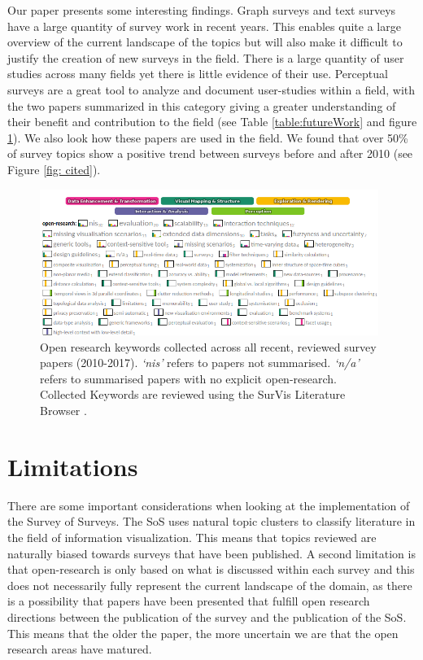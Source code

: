 Our paper presents some interesting findings. Graph surveys and text surveys have a large quantity of survey work in recent years. This enables quite a large overview of the current landscape of the topics but will also make it difficult to justify the creation of new surveys in the field. There is a large quantity of user studies across many fields yet there is little evidence of their use. Perceptual surveys are a great tool to analyze and document user-studies within a field, with the two papers summarized in this category giving a greater understanding of their benefit and contribution to the field \cite{johansson2016evaluation, fuchs2016systematic} (see Table \ref{table:futureWork} and figure \ref{fig: openresearch}). We also look how these papers are used in the field. We found that over 50\% of survey topics show a positive trend between surveys before and after 2010 (see Figure \ref{fig: cited}).


\begin{figure}[t]
\begin{center}
\includegraphics[width=0.98\textwidth]{images/open-research2.png}
\caption{Open research keywords collected across all recent, reviewed survey papers (2010-2017). \textit{`nis'} refers to papers not summarised. \textit{`n/a'} refers to summarised papers with no explicit open-research. Collected Keywords are reviewed using the SurVis Literature Browser \cite{beck2016visual, surVis}.} \label{fig: openresearch}
\end{center}
\end{figure}

\section{Limitations}
There are some important considerations when looking at the implementation of the Survey of Surveys. The SoS uses natural topic clusters to classify literature in the field of information visualization. This means that topics reviewed are naturally biased towards surveys that have been published. A second limitation is that open-research is only based on what is discussed within each survey and this does not necessarily fully represent the current landscape of the domain, as there is a possibility that papers have been presented that fulfill open research directions between the publication of the survey and the publication of the SoS. This means that the older the paper, the more uncertain we are that the open research areas have matured.

